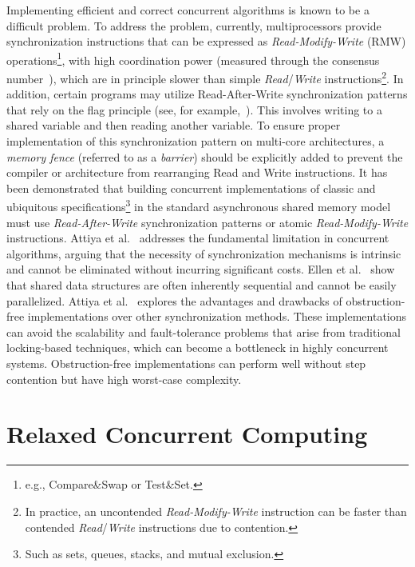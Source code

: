 Implementing efficient and correct concurrent algorithms is known to be a difficult problem.
To address the problem, currently, multiprocessors provide synchronization instructions that can be expressed as \textit{Read-Modify-Write} (RMW) operations\footnote{e.g., Compare\&Swap or Test\&Set.}, with high coordination power (measured through the consensus number~\cite{DBLP_journals_toplas_Herlihy91}), which are in principle slower than simple \textit{Read}/\textit{Write} instructions\footnote{In practice, an uncontended \textit{Read-Modify-Write} instruction can be faster than contended \textit{Read}/\textit{Write} instructions due to contention.}. In addition, certain programs may utilize Read-After-Write synchronization patterns that rely on the flag principle (see, for example,~\cite {DBLP_books_daglib_0020056}). This involves writing to a shared variable and then reading another variable. To ensure proper implementation of this synchronization pattern on multi-core architectures, a \textit{memory fence} (referred to as a \textit{barrier}) should be explicitly added to prevent the compiler or architecture from rearranging Read and Write instructions. It has been demonstrated that building concurrent implementations of classic and ubiquitous specifications\footnote{Such as sets, queues, stacks, and mutual exclusion.} in the standard asynchronous shared memory model must use \textit{Read-After-Write} synchronization patterns or atomic \textit{Read-Modify-Write} instructions. Attiya et al.~\cite{DBLP_conf_popl_AttiyaGHKMV11} addresses the fundamental limitation in concurrent algorithms, arguing that the necessity of synchronization mechanisms is intrinsic and cannot be eliminated without incurring significant costs. Ellen et al.~\cite{DBLP_journals_siamcomp_EllenHS12} show that shared data structures are often inherently sequential and cannot be easily parallelized. Attiya et al.~\cite{DBLP_journals_jacm_AttiyaGHK09} explores the advantages and drawbacks of obstruction-free implementations over other synchronization methods. These implementations can avoid the scalability and fault-tolerance problems that arise from traditional locking-based techniques, which can become a bottleneck in highly concurrent systems. Obstruction-free implementations can perform well without step contention but have high worst-case complexity.

\section{\label{section:relaxed-concurrent}Relaxed Concurrent Computing}

